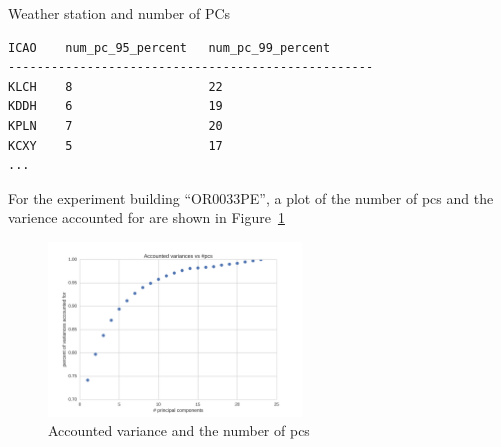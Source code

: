 \documentclass[12pt]{article}
\newcommand{\fref}[1]{Figure~\ref{#1}}
\begin{document}
Weather station and number of PCs
\begin{verbatim}
ICAO	num_pc_95_percent	num_pc_99_percent
---------------------------------------------------
KLCH	8	                22
KDDH	6	                19
KPLN	7	                20
KCXY	5	                17
...
\end{verbatim}
For the experiment building ``OR0033PE'', a plot of the number of pcs and the varience accounted for are shown in \fref{fig:pcs}
\begin{figure}[h!]
  \centering
  \includegraphics[width=0.6\textwidth]{images/pca_err_numpc_OR0033PE.png}
  \caption{Accounted variance and the number of pcs}
  \label{fig:pcs}
\end{figure}
\end{document}
